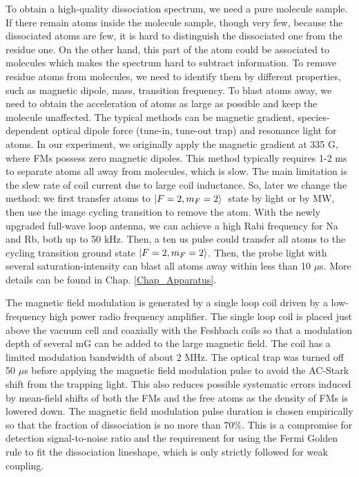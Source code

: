 To obtain a high-quality dissociation spectrum, we need a pure molecule sample. If there remain atoms inside the molecule sample, though very few, because the dissociated atoms are few, it is hard to distinguish the dissociated one from the residue one. On the other hand, this part of the atom could be associated to molecules which makes the spectrum hard to subtract information. To remove residue atoms from molecules, we need to identify them by different properties, such as magnetic dipole, mass, transition frequency. To blast atoms away, we need to obtain the acceleration of atoms as large as possible and keep the molecule unaffected. The typical methods can be magnetic gradient, species-dependent optical dipole force (tune-in, tune-out trap) and resonance light for atoms. In our experiment, we originally apply the magnetic gradient at 335 G, where FMs possess zero magnetic dipoles. This method typically requires 1-2 ms to separate atoms all away from molecules, which is slow. The main limitation is the slew rate of coil current due to large coil inductance. So, later we change the method: we first transfer atoms to $\ket{F=2,m_F=2}$~state by light or by MW, then use the image cycling transition to remove the atom. With the newly upgraded full-wave loop antenna, we can achieve a high Rabi frequency for Na and Rb, both up to 50 kHz. Then, a ten us pulse could transfer all atoms to the cycling transition ground state $\ket{F=2,m_F=2}$. Then, the probe light with several saturation-intensity can blast all atoms away within less than 10 $\mu$s. More details can be found in Chap. \ref{Chap_Apparatus}.

The magnetic field modulation is generated by a single loop coil driven by a low-frequency high power radio frequency amplifier. The single loop coil is placed just above the vacuum cell and coaxially with the Feshbach coils so that a modulation depth of several mG can be added to the large magnetic field. The coil has a limited modulation bandwidth of about 2 MHz. The optical trap was turned off 50 $\mu$s before applying the magnetic field modulation pulse to avoid the AC-Stark shift from the trapping light. This also reduces possible systematic errors induced by mean-field shifts of both the FMs and the free atoms as the density of FMs is lowered down. The magnetic field modulation pulse duration is chosen empirically so that the fraction of dissociation is no more than $70\%$. This is a compromise for detection signal-to-noise ratio and the requirement for using the Fermi Golden rule to fit the dissociation lineshape, which is only strictly followed for weak coupling. 

